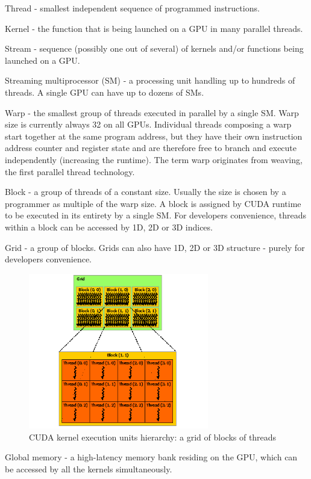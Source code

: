 \documentclass[12pt,a4paper,notitlepage]{report}
\begin{document}
Thread - smallest independent sequence of programmed instructions.

Kernel - the function that is being launched on a GPU in many parallel threads.

Stream - sequence (possibly one out of several) of kernels and/or functions being launched on a GPU.

Streaming multiprocessor (SM) - a processing unit handling up to hundreds of threads. A single GPU can have up to dozens of SMs.

Warp - the smallest group of threads executed in parallel by a single SM. Warp size is currently always 32 on all GPUs. Individual threads composing a warp start together at the same program address, but they have their own instruction address counter and register state and are therefore free to branch and execute independently (increasing the runtime). The term warp originates from weaving, the first parallel thread technology. 

Block - a group of threads of a constant size. Usually the size is chosen by a programmer as multiple of the warp size. A block is assigned by CUDA runtime to be executed in its entirety by a single SM. For developers convenience, threads within a block can be accessed by 1D, 2D or 3D indices.

Grid - a group of blocks. Grids can also have 1D, 2D or 3D structure - purely for developers convenience.
\begin{figure}
    \centering
    \includegraphics[width=0.7\textwidth]{pics/grid-of-thread-blocks.png}
    \caption{CUDA kernel execution units hierarchy: a grid of blocks of threads}
    \label{fig:grid}
\end{figure}
\FloatBarrier

Global memory - a high-latency memory bank residing on the GPU, which can be accessed by all the kernels simultaneously.
\end{document}
